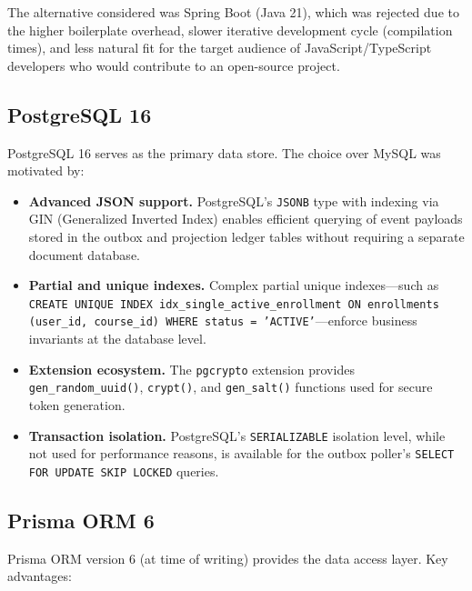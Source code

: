 The alternative considered was Spring Boot (Java 21), which was rejected due to the higher boilerplate overhead, slower iterative development cycle (compilation times), and less natural fit for the target audience of JavaScript/TypeScript developers who would contribute to an open-source project.

\subsection{PostgreSQL 16}
\label{subsec:app-postgresql}

PostgreSQL 16 serves as the primary data store. The choice over MySQL was motivated by:

\begin{itemize}
  \item \textbf{Advanced JSON support.} PostgreSQL's \texttt{JSONB} type with indexing via GIN (Generalized Inverted Index) enables efficient querying of event payloads stored in the outbox and projection ledger tables without requiring a separate document database.
  \item \textbf{Partial and unique indexes.} Complex partial unique indexes---such as \texttt{CREATE UNIQUE INDEX idx\_single\_active\_enrollment ON enrollments (user\_id, course\_id) WHERE status = 'ACTIVE'}---enforce business invariants at the database level.
  \item \textbf{Extension ecosystem.} The \texttt{pgcrypto} extension provides \texttt{gen\_random\_uuid()}, \texttt{crypt()}, and \texttt{gen\_salt()} functions used for secure token generation.
  \item \textbf{Transaction isolation.} PostgreSQL's \texttt{SERIALIZABLE} isolation level, while not used for performance reasons, is available for the outbox poller's \texttt{SELECT FOR UPDATE SKIP LOCKED} queries.
\end{itemize}

\subsection{Prisma ORM 6}
\label{subsec:app-prisma}

Prisma ORM version 6 (at time of writing) provides the data access layer. Key advantages:

